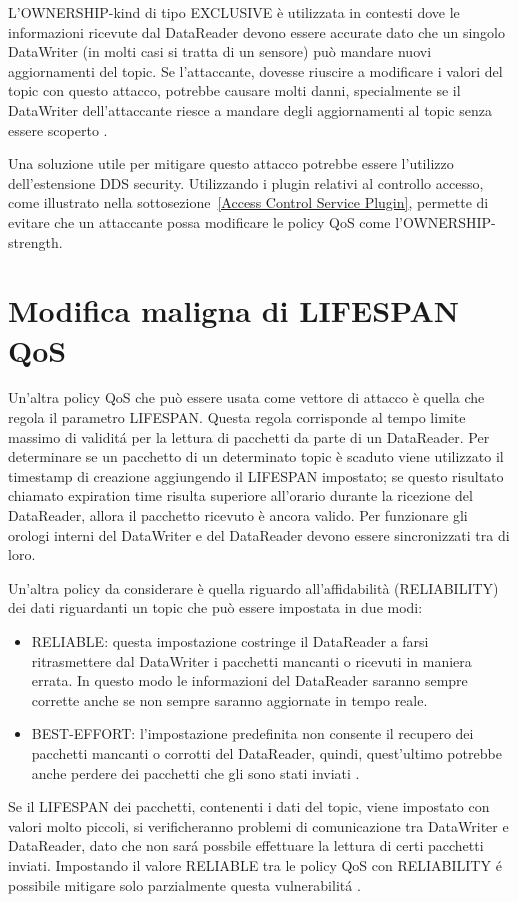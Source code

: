 L'OWNERSHIP-kind di tipo EXCLUSIVE è utilizzata in contesti dove le
informazioni ricevute dal DataReader devono essere accurate dato che un singolo
DataWriter (in molti casi si tratta di un sensore) può mandare nuovi aggiornamenti
del topic. Se l'attaccante, dovesse riuscire a modificare i valori del topic con
questo attacco, potrebbe causare molti danni,
specialmente se il DataWriter dell'attaccante riesce a mandare degli aggiornamenti
al topic senza essere scoperto
\cite{DBLP:conf/malware/MichaudDL18}.

Una soluzione utile per mitigare questo attacco potrebbe essere l'utilizzo
dell'estensione DDS security. Utilizzando i plugin relativi al controllo accesso,
come illustrato nella sottosezione~\ref{Access Control Service Plugin}, permette
di evitare che un attaccante possa modificare le policy QoS come 
l'OWNERSHIP-strength.


\section{Modifica maligna di LIFESPAN QoS}

Un'altra policy QoS che può essere usata come vettore di attacco è quella
che regola il parametro LIFESPAN. Questa regola corrisponde al tempo limite massimo 
di validitá per la
lettura di pacchetti da parte di un DataReader. Per determinare se un pacchetto
di un determinato topic è scaduto viene utilizzato il timestamp di creazione
aggiungendo il LIFESPAN impostato; se questo risultato chiamato 
expiration time risulta
superiore all'orario durante la ricezione del DataReader, allora il pacchetto
ricevuto è ancora valido. 
Per funzionare gli orologi interni del DataWriter e del DataReader
devono essere sincronizzati tra di loro.

Un'altra policy da considerare è quella riguardo all'affidabilità
(RELIABILITY) dei dati riguardanti un topic che può essere impostata in due
modi:
\begin{itemize}
    \item RELIABLE: questa impostazione costringe il DataReader a farsi
    ritrasmettere dal DataWriter i pacchetti mancanti o ricevuti in maniera errata.
    In questo modo le informazioni del DataReader saranno sempre corrette anche
    se non sempre saranno aggiornate in tempo reale.
    \item BEST-EFFORT: l'impostazione predefinita non consente il recupero
    dei pacchetti mancanti o corrotti
    del DataReader, quindi, quest'ultimo potrebbe anche perdere dei pacchetti 
    che gli sono stati inviati \cite{dds1.4}.
\end{itemize}
Se il LIFESPAN dei pacchetti, contenenti i dati del topic,
viene impostato con valori molto piccoli, si verificheranno problemi di comunicazione
tra DataWriter e DataReader, dato che non sará possbile effettuare la lettura di 
certi pacchetti inviati. Impostando il valore RELIABLE tra le policy QoS con
RELIABILITY é possibile mitigare 
solo parzialmente questa vulnerabilitá
\cite{DBLP:conf/malware/MichaudDL18}.

